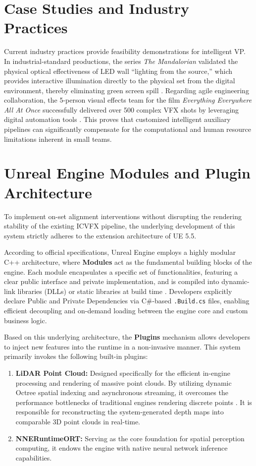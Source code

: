 \documentclass[12pt,a4paper]{report}
\begin{document}
\section{Case Studies and Industry Practices}
Current industry practices provide feasibility demonstrations for intelligent VP. In industrial-standard productions, the series \textit{The Mandalorian} validated the physical optical effectiveness of LED wall ``lighting from the source,'' which provides interactive illumination directly to the physical set from the digital environment, thereby eliminating green screen spill \cite{kadner2019vp}. Regarding agile engineering collaboration, the 5-person visual effects team for the film \textit{Everything Everywhere All At Once} successfully delivered over 500 complex VFX shots by leveraging digital automation tools \cite{seymour2022eeaao}. This proves that customized intelligent auxiliary pipelines can significantly compensate for the computational and human resource limitations inherent in small teams.

\section{Unreal Engine Modules and Plugin Architecture}
To implement on-set alignment interventions without disrupting the rendering stability of the existing ICVFX pipeline, the underlying development of this system strictly adheres to the extension architecture of UE 5.5.

According to official specifications, Unreal Engine employs a highly modular C++ architecture, where \textbf{Modules} act as the fundamental building blocks of the engine. Each module encapsulates a specific set of functionalities, featuring a clear public interface and private implementation, and is compiled into dynamic-link libraries (DLLs) or static libraries at build time \cite{epic2024modules}. Developers explicitly declare Public and Private Dependencies via C\#-based \texttt{.Build.cs} files, enabling efficient decoupling and on-demand loading between the engine core and custom business logic.

Based on this underlying architecture, the \textbf{Plugins} mechanism allows developers to inject new features into the runtime in a non-invasive manner. This system primarily invokes the following built-in plugins:
\begin{enumerate}
    \item \textbf{LiDAR Point Cloud:} Designed specifically for the efficient in-engine processing and rendering of massive point clouds. By utilizing dynamic Octree spatial indexing and asynchronous streaming, it overcomes the performance bottlenecks of traditional engines rendering discrete points \cite{epic2024lidar}. It is responsible for reconstructing the system-generated depth maps into comparable 3D point clouds in real-time.
    \item \textbf{NNERuntimeORT:} Serving as the core foundation for spatial perception computing, it endows the engine with native neural network inference capabilities.
\end{enumerate}
\end{document}
